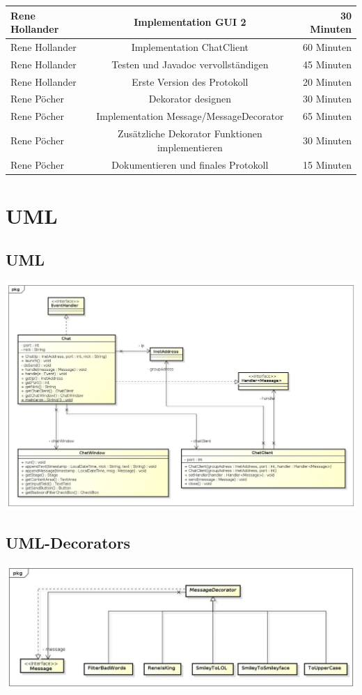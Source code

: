\documentclass[a4paper, 11pt]{article}
\begin{document}
\begin{tabular}{|l|c|r|}
  \hline
  Rene Hollander & Implementation GUI 2 & 30 Minuten\\
  \hline
  Rene Hollander & Implementation ChatClient & 60 Minuten \\
  \hline
  Rene Hollander & Testen und Javadoc vervollständigen & 45 Minuten \\
  \hline
  Rene Hollander & Erste Version des Protokoll & 20 Minuten \\
  
    \hline
    Rene Pöcher &  Dekorator designen & 30 Minuten\\
    \hline
    Rene Pöcher & Implementation Message/MessageDecorator & 65 Minuten \\
    \hline
    Rene Pöcher & Zusätzliche Dekorator Funktionen implementieren & 30 Minuten \\
    \hline
    Rene Pöcher & Dokumentieren und finales Protokoll & 15 Minuten \\
    \hline
 \end{tabular}

\section{UML}
\subsection{UML}
\includegraphics[width=15.5cm]{UML}

\newpage
\subsection{UML-Decorators}
\includegraphics[width=15.5cm]{Decorators}
\end{document}
